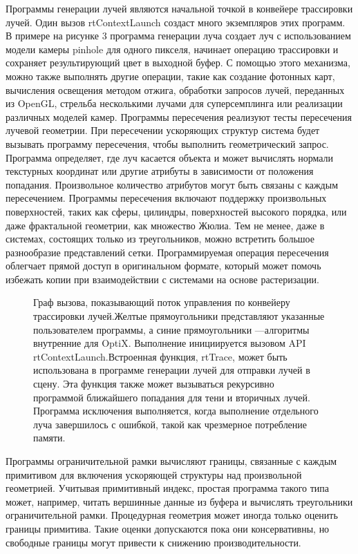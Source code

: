 Программы генерации лучей являются начальной точкой в конвейере трассировки лучей.
Один вызов rtContextLaunch создаст много экземпляров этих программ.
В примере на рисунке 3 программа генерации луча создает луч с использованием модели камеры pinhole для одного пикселя, начинает операцию трассировки и сохраняет результирующий цвет в выходной буфер.
 С помощью этого механизма, можно также выполнять другие операции, такие как создание фотонных карт, вычисления освещения методом отжига, обработки запросов лучей, переданных из OpenGL, стрельба несколькими лучами для суперсемплинга или реализации различных моделей камер.
Программы пересечения реализуют тесты пересечения лучевой геометрии.
При пересечении ускоряющих структур система будет вызывать программу пересечения, чтобы выполнить геометрический запрос.
Программа определяет, где луч касается объекта и может вычислять нормали текстурных координат или другие атрибуты в зависимости от положения попадания.
Произвольное количество атрибутов могут быть связаны с каждым пересечением.
Программы пересечения включают поддержку произвольных поверхностей, таких как сферы, цилиндры, поверхностей высокого порядка, или даже фрактальной геометрии, как множество Жюлиа.
Тем не менее, даже в системах, состоящих только из треугольников, можно встретить большое разнообразие представлений сетки.
Программируемая операция пересечения облегчает прямой доступ в оригинальном формате, который может помочь избежать копии при взаимодействии с системами на основе растеризации.
\begin{figure}[h]
\caption{\small{Граф вызова, показывающий поток управления по конвейеру трассировки лучей.Желтые прямоугольники представляют указанные пользователем программы, а синие прямоугольники ---алгоритмы внутренние для OptiX.
Выполнение инициируется вызовом API rtContextLaunch.Встроенная функция, rtTrace, может быть использована в программе генерации лучей для отправки лучей в сцену.
Эта функция также может вызываться рекурсивно программой ближайшего попадания для тени и вторичных лучей.
Программа исключения выполняется, когда выполнение отдельного луча завершилось с ошибкой, такой как чрезмерное потребление памяти.}}
\label{fig:graph-of-calling}
\end{figure}

Программы ограничительной рамки вычисляют границы, связанные с каждым примитивом для включения ускоряющей структуры над произвольной геометрией.
Учитывая примитивный индекс, простая программа такого типа может, например, читать вершинные данные из буфера и вычислять треугольники ограничительной рамки.
Процедурная геометрия может иногда только оценить границы примитива.
Такие оценки допускаются пока они консервативны, но свободные границы могут привести к снижению производительности.

